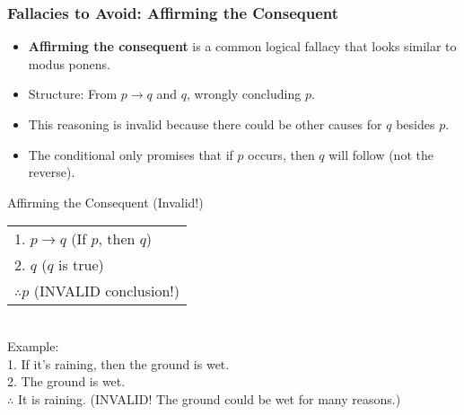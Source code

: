 \documentclass{beamer}
\begin{document}
                            \begin{frame}
                                \frametitle{Fallacies to Avoid: Affirming the Consequent}
                                \begin{itemize}
                                    \item \textbf{Affirming the consequent} is a common logical fallacy that looks similar to modus ponens.
                                    \item Structure: From $p \rightarrow q$ and $q$, wrongly concluding $p$.
                                    \item This reasoning is invalid because there could be other causes for $q$ besides $p$.
                                    \item The conditional only promises that if $p$ occurs, then $q$ will follow (not the reverse).
                                \end{itemize}
                                
                                \begin{alertblock}{Affirming the Consequent (Invalid!)}
                                    \scriptsize
                                \begin{tabular}{l}
                                1. $p \rightarrow q$ \hspace{1cm} (If $p$, then $q$) \\
                                2. $q$ \hspace{2.1cm} ($q$ is true) \\
                                \hline
                                $\therefore p$ \hspace{1.8cm} (INVALID conclusion!)
                                \end{tabular}\\[0.3cm]
                                Example:\\
                                1. If it's raining, then the ground is wet.\\
                                2. The ground is wet.\\
                                $\therefore$ It is raining. (INVALID! The ground could be wet for many reasons.)
                                \end{alertblock}
                                \end{frame}
                                
\end{document}
